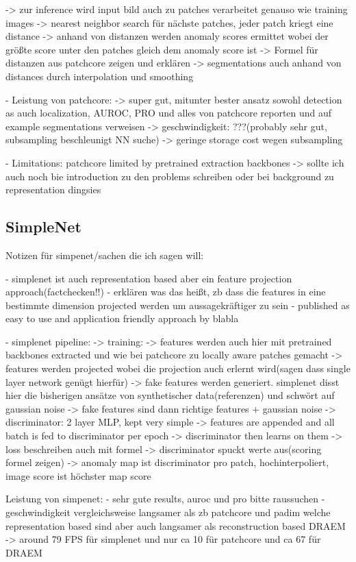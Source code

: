-> zur inference wird input bild auch zu patches verarbeitet genauso wie training images
-> nearest neighbor search für nächste patches, jeder patch kriegt eine distance
-> anhand von distanzen werden anomaly scores ermittet wobei der größte score unter den patches gleich dem anomaly score ist
-> Formel für distanzen aus patchcore zeigen und erklären
-> segmentations auch anhand von distances durch interpolation und smoothing

- Leistung von patchcore:
-> super gut, mitunter bester ansatz sowohl detection as auch localization, AUROC, PRO und alles von patchcore reporten und auf example segmentations verweisen
-> geschwindigkeit: ???(probably sehr gut, subsampling beschleunigt NN suche)
-> geringe storage cost wegen subsampling


- Limitations: patchcore limited by pretrained extraction backbones -> sollte ich auch noch bie introduction zu den problems schreiben oder bei background zu representation dingsies


\subsection{SimpleNet}
\label{subsec:simplenet}
Notizen für simpenet/sachen die ich sagen will:

- simplenet ist auch representation based aber ein feature projection approach(factchecken!!)
- erklären was das heißt, zb dass die features in eine bestimmte dimension projected werden um aussagekräftiger zu sein
- published as easy to use and application friendly approach by blabla

- simplenet pipeline:
-> training:
-> features werden auch hier mit pretrained backbones extracted und wie bei patchcore zu locally aware patches gemacht
-> features werden projected wobei die projection auch erlernt wird(sagen dass single layer network genügt hierfür)
-> fake features werden generiert. simplenet disst hier die bisherigen ansätze von synthetischer data(referenzen) und schwört auf gaussian noise
-> fake features sind dann richtige features + gaussian noise
-> discriminator: 2 layer MLP, kept very simple
-> features are appended and all batch is fed to discriminator per epoch
-> discriminator then learns on them
-> loss beschreiben auch mit formel
-> discriminator spuckt werte aus(scoring formel zeigen)
-> anomaly map ist discriminator pro patch, hochinterpoliert, image score ist höchster map score

Leistung von simpenet:
- sehr gute results, auroc und pro bitte raussuchen
- geschwindigkeit vergleichsweise langsamer als zb patchcore und padim welche representation based sind aber auch langsamer als reconstruction 
based DRAEM -> around 79 FPS für simplenet und nur ca 10 für patchcore und ca 67 für DRAEM




